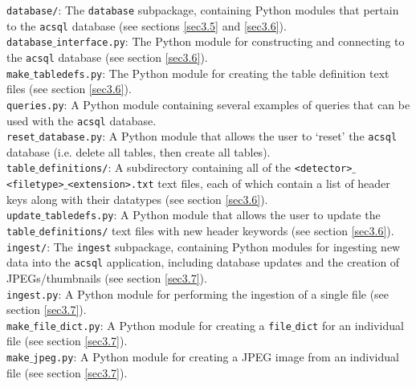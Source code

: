 \documentclass[10pt,journal,compsoc]{IEEEtran}
\begin{document}
\noindent\texttt{database/}: The \texttt{database} subpackage, containing Python modules that pertain to the \texttt{acsql} database (see sections \ref{sec3.5} and \ref{sec3.6}).\\

\noindent\texttt{database$\_$interface.py}: The Python module for constructing and connecting to the \texttt{acsql} database (see section \ref{sec3.6}).\\

\noindent\texttt{make$\_$tabledefs.py}: The Python module for creating the table definition text files (see section \ref{sec3.6}).\\

\noindent\texttt{queries.py}: A Python module containing several examples of queries that can be used with the \texttt{acsql} database.\\

\noindent\texttt{reset$\_$database.py}: A Python module that allows the user to `reset' the \texttt{acsql} database (i.e. delete all tables, then create all tables).\\

\noindent\texttt{table$\_$definitions/}: A subdirectory containing all of the \texttt{<detector>$\_$<filetype>$\_$<extension>.txt} text files, each of which contain a list of header keys along with
their datatypes (see section \ref{sec3.6}).\\

\noindent\texttt{update$\_$tabledefs.py}: A Python module that allows the user to update the \texttt{table$\_$definitions/} text files with new header keywords (see section \ref{sec3.6}).\\

\noindent\texttt{ingest/}: The \texttt{ingest} subpackage, containing Python modules for ingesting new data into the \texttt{acsql} application, including database updates and the creation of
JPEGs/thumbnails (see section \ref{sec3.7}).\\

\noindent\texttt{ingest.py}: A Python module for performing the ingestion of a single file (see section \ref{sec3.7}).\\

\noindent\texttt{make$\_$file$\_$dict.py}: A Python module for creating a \texttt{file$\_$dict} for an individual file (see section \ref{sec3.7}).\\

\noindent\texttt{make$\_$jpeg.py}: A Python module for creating a JPEG image from an individual file (see section \ref{sec3.7}).\\
\end{document}
